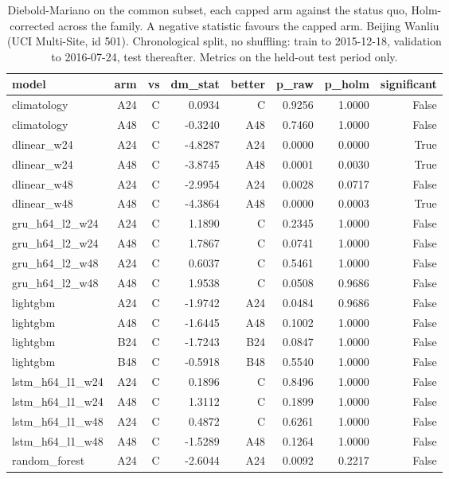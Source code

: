 \begin{table}[htbp]
\caption{Diebold-Mariano on the common subset, each capped arm against the status quo, Holm-corrected across the family. A negative statistic favours the capped arm. Beijing Wanliu (UCI Multi-Site, id 501). Chronological split, no shuffling: train to 2015-12-18, validation to 2016-07-24, test thereafter. Metrics on the held-out test period only.}
\label{tab:lookback_dm_tests}
\begin{tabular}{lrrrrrrr}
\toprule
model & arm & vs & dm\_stat & better & p\_raw & p\_holm & significant \\
\midrule
climatology & A24 & C & 0.0934 & C & 0.9256 & 1.0000 & False \\
climatology & A48 & C & -0.3240 & A48 & 0.7460 & 1.0000 & False \\
dlinear\_w24 & A24 & C & -4.8287 & A24 & 0.0000 & 0.0000 & True \\
dlinear\_w24 & A48 & C & -3.8745 & A48 & 0.0001 & 0.0030 & True \\
dlinear\_w48 & A24 & C & -2.9954 & A24 & 0.0028 & 0.0717 & False \\
dlinear\_w48 & A48 & C & -4.3864 & A48 & 0.0000 & 0.0003 & True \\
gru\_h64\_l2\_w24 & A24 & C & 1.1890 & C & 0.2345 & 1.0000 & False \\
gru\_h64\_l2\_w24 & A48 & C & 1.7867 & C & 0.0741 & 1.0000 & False \\
gru\_h64\_l2\_w48 & A24 & C & 0.6037 & C & 0.5461 & 1.0000 & False \\
gru\_h64\_l2\_w48 & A48 & C & 1.9538 & C & 0.0508 & 0.9686 & False \\
lightgbm & A24 & C & -1.9742 & A24 & 0.0484 & 0.9686 & False \\
lightgbm & A48 & C & -1.6445 & A48 & 0.1002 & 1.0000 & False \\
lightgbm & B24 & C & -1.7243 & B24 & 0.0847 & 1.0000 & False \\
lightgbm & B48 & C & -0.5918 & B48 & 0.5540 & 1.0000 & False \\
lstm\_h64\_l1\_w24 & A24 & C & 0.1896 & C & 0.8496 & 1.0000 & False \\
lstm\_h64\_l1\_w24 & A48 & C & 1.3112 & C & 0.1899 & 1.0000 & False \\
lstm\_h64\_l1\_w48 & A24 & C & 0.4872 & C & 0.6261 & 1.0000 & False \\
lstm\_h64\_l1\_w48 & A48 & C & -1.5289 & A48 & 0.1264 & 1.0000 & False \\
random\_forest & A24 & C & -2.6044 & A24 & 0.0092 & 0.2217 & False \\

\end{tabular}
\end{table}
